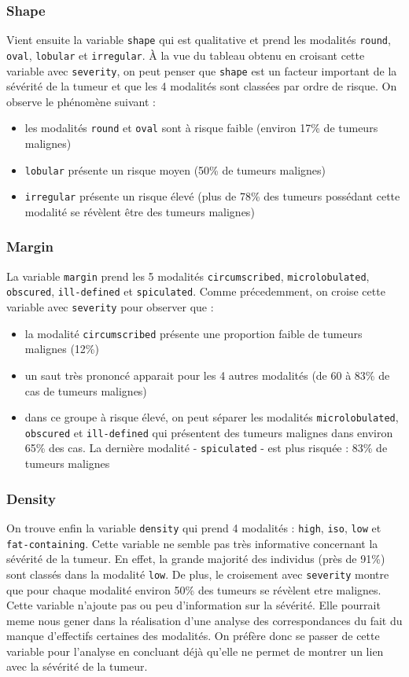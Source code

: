 \documentclass[a4paper]{report}
\begin{document}
\subsubsection{Shape}
Vient ensuite la variable \verb|shape| qui est qualitative et prend les modalités \verb|round|, \verb|oval|, \verb|lobular| et \verb|irregular|. À la vue du tableau obtenu en croisant cette variable avec \verb|severity|, on peut penser que \verb|shape| est un facteur important de la sévérité de la tumeur et que les 4 modalités sont classées par ordre de risque. On observe le phénomène suivant :
\begin{itemize}
\item les modalités \verb|round| et \verb|oval| sont à risque faible (environ 17\% de tumeurs malignes)
\item \verb|lobular| présente un risque moyen (50\% de tumeurs malignes)
\item \verb|irregular| présente un risque élevé (plus de 78\% des tumeurs possédant cette modalité se révèlent être des tumeurs malignes)
\end{itemize}


\subsubsection{Margin}
La variable \verb|margin| prend les 5 modalités \verb|circumscribed|, \verb|microlobulated|, \verb|obscured|, \verb|ill-defined| et \verb|spiculated|. Comme précedemment, on croise cette variable avec \verb|severity| pour observer que :
\begin{itemize}
\item la modalité \verb|circumscribed| présente une proportion faible de tumeurs malignes (12\%)
\item un saut très prononcé apparait pour les 4 autres modalités (de 60 à 83\% de cas de tumeurs malignes)
\item dans ce groupe à risque élevé, on peut séparer les modalités  \verb|microlobulated|, \verb|obscured| et \verb|ill-defined| qui présentent des tumeurs malignes dans environ 65\% des cas. La dernière modalité - \verb|spiculated| - est plus risquée : 83\% de tumeurs malignes
\end{itemize}
 

\subsubsection{Density}
On trouve enfin la variable \verb|density| qui prend 4 modalités : \verb|high|, \verb|iso|, \verb|low| et \verb|fat-containing|. Cette variable ne semble pas très informative concernant la sévérité de la tumeur. En effet, la grande majorité des individus (près de 91\%) sont classés dans la modalité \verb|low|. De plus, le croisement avec \verb|severity| montre que pour chaque modalité environ 50\% des tumeurs se révèlent etre malignes. Cette variable n'ajoute pas ou peu d'information sur la sévérité. Elle pourrait meme nous gener dans la réalisation d'une analyse des correspondances du fait du manque d'effectifs certaines des modalités. On préfère donc se passer de cette variable pour l'analyse en concluant déjà qu'elle ne permet de montrer un lien avec la sévérité de la tumeur.
\end{document}
